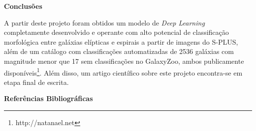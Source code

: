 \documentclass[10pt, a4paper, twocolumn]{article}
\begin{document}
\begin{center}
  \bf\fontsize{13}{15.6}\selectfont Conclusões
\end{center}

A partir deste projeto foram obtidos um modelo de \emph{Deep Learning} completamente desenvolvido e operante com alto potencial de classificação morfológica entre galáxias elípticas e espirais a partir de imagens do S-PLUS, além de um catálogo com classificações automatizadas de 2536 galáxias com magnitude menor que 17 sem classificações no GalaxyZoo, ambos publicamente disponíveis\footnote{http://natanael.net}. Além disso, um artigo científico sobre este projeto encontra-se em etapa final de escrita.



\begin{center}
  \bf\fontsize{13}{15.6}\selectfont Referências Bibliográficas
\end{center}

\printbibliography[heading=none]
\end{document}
